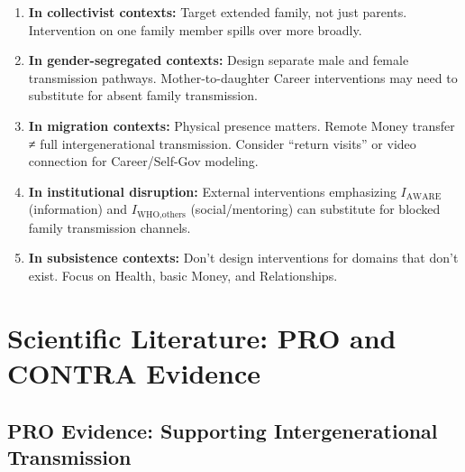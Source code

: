 \begin{tcolorbox}[colback=green!5!white, colframe=green!75!black,
    title=Cross-Cultural Intervention Principles]
\begin{enumerate}
\item \textbf{In collectivist contexts:} Target extended family, not just parents.
      Intervention on one family member spills over more broadly.

\item \textbf{In gender-segregated contexts:} Design separate male and female transmission
      pathways. Mother-to-daughter Career interventions may need to substitute for
      absent family transmission.

\item \textbf{In migration contexts:} Physical presence matters. Remote Money transfer ≠
      full intergenerational transmission. Consider ``return visits'' or video connection
      for Career/Self-Gov modeling.

\item \textbf{In institutional disruption:} External interventions emphasizing $I_{\text{AWARE}}$ (information) and $I_{\text{WHO},\text{others}}$ (social/mentoring) can substitute for blocked family transmission channels.

\item \textbf{In subsistence contexts:} Don't design interventions for domains that don't
      exist. Focus on Health, basic Money, and Relationships.
\end{enumerate}
\end{tcolorbox}


\section{Scientific Literature: PRO and CONTRA Evidence}
\label{sec:BI-literature}

\subsection{PRO Evidence: Supporting Intergenerational Transmission}

